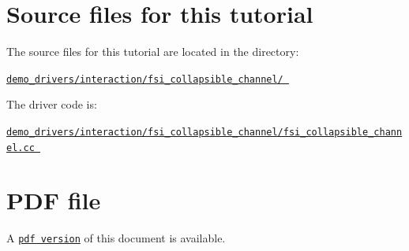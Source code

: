  

\hypertarget{index_sources}{}\section{Source files for this tutorial}\label{index_sources}

\begin{DoxyItemize}
\item The source files for this tutorial are located in the directory\+: \begin{center} \href{../../../../demo_drivers/interaction/fsi_collapsible_channel/}{\tt demo\+\_\+drivers/interaction/fsi\+\_\+collapsible\+\_\+channel/ } \end{center} 
\item The driver code is\+: \begin{center} \href{../../../../demo_drivers/interaction/fsi_collapsible_channel/fsi_collapsible_channel.cc}{\tt demo\+\_\+drivers/interaction/fsi\+\_\+collapsible\+\_\+channel/fsi\+\_\+collapsible\+\_\+channel.\+cc } \end{center} 
\end{DoxyItemize}

 

 \hypertarget{index_pdf}{}\section{P\+D\+F file}\label{index_pdf}
A \href{../latex/refman.pdf}{\tt pdf version} of this document is available. 
